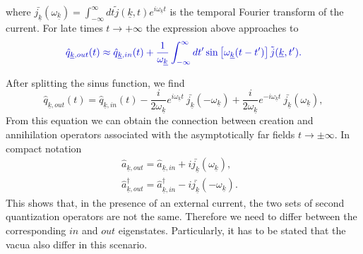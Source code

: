 \documentclass[12pt, titlepage]{article}
\begin{document}
where $ \bar{j_{\underline{k}}}(\omega_{\underline{k}})= \int^{\infty}_{-\infty}dt \tilde{j}(\underline{k},t) e^{i\omega_{\underline{k}}t} $ is the temporal Fourier transform of the current.
For late times $ t\rightarrow +\infty $ the expression above approaches to
\begin{equation}\label{q_Out_by_q_In}
 \textcolor[RGB]{0,0,204}{
\hat{q}_{\underline{k},out}(t) 
  \approx
  \hat{q}_{\underline{k},in}(t) 
  +
    \dfrac{1}{\omega_{\underline{k}}}
    \int^{\infty}_{-\infty}
    dt'
    \sin
    \left[
    \omega_{\underline{k}}(t-t') 
    \right]
     \tilde{j}(\underline{k},t')
  .}
\end{equation}

After splitting the sinus function, we find 
\begin{equation}
\hat{q}_{\underline{k},out}(t) 
  =
  \hat{q}_{\underline{k},in}(t) 
  -
  	\dfrac{i}{2\omega_{\underline{k}}}e^{i\omega_{\underline{k}}t}\
	\bar{j_{\underline{k}}}(-\omega_{\underline{k}})
  +
  	\dfrac{i}{2\omega_{\underline{k}}}e^{-i\omega_{\underline{k}}t}\
  	\bar{j_{\underline{k}}}(\omega_{\underline{k}}),
\end{equation}
From this equation we can obtain the connection between creation and annihilation operators associated with the asymptotically far fields $ t\rightarrow \pm \infty $. In compact notation
\begin{subequations}\label{differ_by_current}
\begin{align}
\hat{a}_{\underline{k},out}=  \hat{a}_{\underline{k},in}+i
\bar{j_{\underline{k}}}(\omega_{\underline{k}}) ,
&\\
\hat{a}^{\dagger}_{\underline{k},out} = \hat{a}^{\dagger}_{\underline{k},in}
-i
\bar{j_{\underline{k}}}(-\omega_{\underline{k}})  .
\end{align}
\end{subequations}
This shows that, in the presence of an external current, the two sets of second quantization operators are not the same. Therefore we need to differ between the corresponding $ in $ and $ out $ eigenstates. Particularly, it has to be stated that the vacua also differ in this scenario.%
\end{document}

